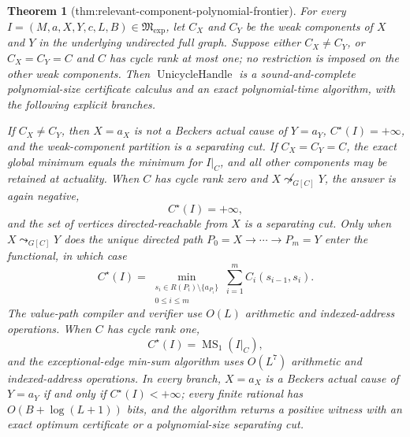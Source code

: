 \documentclass{article}
\newtheorem{theorem}{Theorem}
\begin{document}
\begin{theorem}[thm:relevant-component-polynomial-frontier]\label{thm:relevant-component-polynomial-frontier}
For every \(I=(M,a,X,Y,c,L,B)\in\mathfrak M_{\mathrm{exp}}\), let \(C_X\) and \(C_Y\) be the weak components of \(X\) and \(Y\) in the underlying undirected full graph.  Suppose either \(C_X\ne C_Y\), or \(C_X=C_Y=C\) and \(C\) has cycle rank at most one; no restriction is imposed on the other weak components.  Then \(\operatorname{UnicycleHandle}\) is a sound-and-complete polynomial-size certificate calculus and an exact polynomial-time algorithm, with the following explicit branches.

If \(C_X\ne C_Y\), then \(X=a_X\) is not a Beckers actual cause of \(Y=a_Y\), \(C^\star(I)=+\infty\), and the weak-component partition is a separating cut.  If \(C_X=C_Y=C\), the exact global minimum equals the minimum for \(I|_C\), and all other components may be retained at actuality.  When \(C\) has cycle rank zero and \(X\not\leadsto_{G[C]}Y\), the answer is again negative,
\[
 C^\star(I)=+\infty,
\]
and the set of vertices directed-reachable from \(X\) is a separating cut.  Only when \(X\leadsto_{G[C]}Y\) does the unique directed path \(P_0=X\to\cdots\to P_m=Y\) enter the functional, in which case
\[
 C^\star(I)
 =\min_{\substack{s_i\in R(P_i)\setminus\{a_{P_i}\}\\0\le i\le m}}
   \sum_{i=1}^{m} C_i(s_{i-1},s_i).
\]
The value-path compiler and verifier use \(O(L)\) arithmetic and indexed-address operations.  When \(C\) has cycle rank one,
\[
 C^\star(I)=\operatorname{MS}_1(I|_C),
\]
and the exceptional-edge min-sum algorithm uses \(O(L^7)\) arithmetic and indexed-address operations.  In every branch, \(X=a_X\) is a Beckers actual cause of \(Y=a_Y\) if and only if \(C^\star(I)<+\infty\); every finite rational has \(O(B+\log(L+1))\) bits, and the algorithm returns a positive witness with an exact optimum certificate or a polynomial-size separating cut.
\end{theorem}
\end{document}
